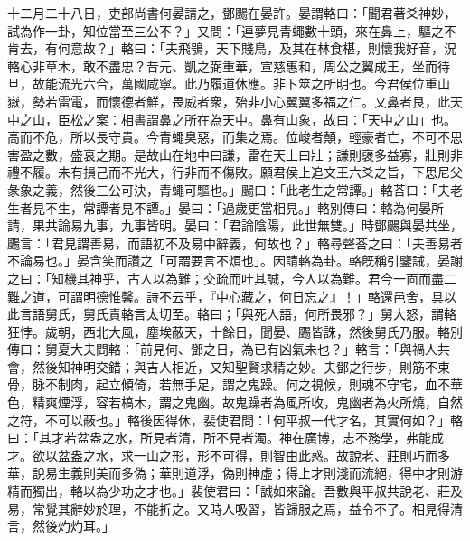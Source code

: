 \begin{pinyinscope}
十二月二十八日，吏部尚書何晏請之，鄧颺在晏許。晏謂輅曰：「聞君著爻神妙，試為作一卦，知位當至三公不？」又問：「連夢見青蠅數十頭，來在鼻上，驅之不肯去，有何意故？」輅曰：「夫飛鴞，天下賤鳥，及其在林食椹，則懷我好音，況輅心非草木，敢不盡忠？昔元、凱之弼重華，宣慈惠和，周公之翼成王，坐而待旦，故能流光六合，萬國咸寧。此乃履道休應。非卜筮之所明也。今君侯位重山嶽，勢若雷電，而懷德者鮮，畏威者衆，殆非小心翼翼多福之仁。又鼻者艮，此天中之山，臣松之案：相書謂鼻之所在為天中。鼻有山象，故曰：「天中之山」也。高而不危，所以長守貴。今青蠅臭惡，而集之焉。位峻者顛，輕豪者亡，不可不思害盈之數，盛衰之期。是故山在地中曰謙，雷在天上曰壯；謙則襃多益寡，壯則非禮不履。未有損己而不光大，行非而不傷敗。願君侯上追文王六爻之旨，下思尼父彖象之義，然後三公可決，青蠅可驅也。」颺曰：「此老生之常譚。」輅荅曰：「夫老生者見不生，常譚者見不譚。」晏曰：「過歲更當相見。」輅別傳曰：輅為何晏所請，果共論易九事，九事皆明。晏曰：「君論陰陽，此世無雙。」時鄧颺與晏共坐，颺言：「君見謂善易，而語初不及易中辭義，何故也？」輅尋聲荅之曰：「夫善易者不論易也。」晏含笑而讚之「可謂要言不煩也」。因請輅為卦。輅旣稱引鑒誡，晏謝之曰：「知機其神乎，古人以為難；交疏而吐其誠，今人以為難。君今一靣而盡二難之道，可謂明德惟馨。詩不云乎，『中心藏之，何日忘之』！」輅還邑舍，具以此言語舅氏，舅氏責輅言太切至。輅曰；「與死人語，何所畏邪？」舅大怒，謂輅狂悖。歲朝，西北大風，塵埃蔽天，十餘日，聞晏、颺皆誅，然後舅氏乃服。輅別傳曰：舅夏大夫問輅：「前見何、鄧之日，為已有凶氣未也？」輅言：「與禍人共會，然後知神明交錯；與吉人相近，又知聖賢求精之妙。夫鄧之行步，則筋不束骨，脉不制肉，起立傾倚，若無手足，謂之鬼躁。何之視候，則魂不守宅，血不華色，精爽煙浮，容若槁木，謂之鬼幽。故鬼躁者為風所收，鬼幽者為火所燒，自然之符，不可以蔽也。」輅後因得休，裴使君問：「何平叔一代才名，其實何如？」輅曰：「其才若盆盎之水，所見者清，所不見者濁。神在廣博，志不務學，弗能成才。欲以盆盎之水，求一山之形，形不可得，則智由此惑。故說老、莊則巧而多華，說易生義則美而多偽；華則道浮，偽則神虛；得上才則淺而流絕，得中才則游精而獨出，輅以為少功之才也。」裴使君曰：「誠如來論。吾數與平叔共說老、莊及易，常覺其辭妙於理，不能折之。又時人吸習，皆歸服之焉，益令不了。相見得清言，然後灼灼耳。」


\end{pinyinscope}
